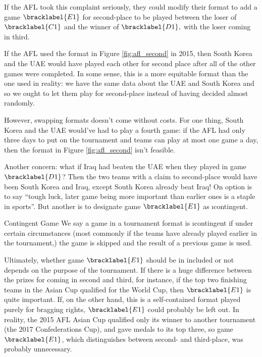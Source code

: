 {    If the AFL took this complaint seriously, they could modify their format to add a game $\bracklabel{E1}$ for second-place to be played between the loser of $\bracklabel{C1}$ and the winner of $\bracklabel{D1},$ with the loser coming in third.


    If the AFL used the format in Figure \ref{fig:afl_second} in 2015, then South Korea and the UAE would have played each other for second place after all of the other games were completed. In some sense, this is a more equitable format than the one used in reality: we have the same data about the UAE and South Korea and so we ought to let them play for second-place instead of having decided almost randomly.

    However, swapping formats doesn't come without costs. For one thing, South Korea and the UAE would've had to play a fourth game: if the AFL had only three days to put on the tournament and teams can play at most one game a day, then the format in Figure \ref{fig:afl_second} isn't feasible.

    Another concern: what if Iraq had beaten the UAE when they played in game $\bracklabel{D1}$? Then the two teams with a claim to second-place would have been South Korea and Iraq, except South Korea already beat Iraq! On option is to say ``tough luck, later game being more important than earlier ones is a staple in sports''. But another is to designate game $\bracklabel{E1}$ as \i{contingent}.

    \begin{definition}{Contingent Game}{}
        We say a game in a tournament format is \i{contingent} if under certain circumstances (most commonly if the teams have already played earlier in the tournament,) the game is skipped and the result of a previous game is used.
    \end{definition}

    Ultimately, whether game $\bracklabel{E1}$ should be in included or not depends on the purpose of the tournament. If there is a huge difference between the prizes for coming in second and third, for instance, if the top two finishing teams in the Asian Cup qualified for the World Cup, then $\bracklabel{E1}$ is quite important. If, on the other hand, this is a self-contained format played purely for bragging rights, $\bracklabel{E1}$ could probably be left out. In reality, the 2015 AFL Asian Cup qualified only its winner to another tournament (the 2017 Confederations Cup), and gave medals to its top three, so game $\bracklabel{E1}$, which distinguishes between second- and third-place, was probably unnecessary.

}
